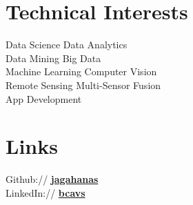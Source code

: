 \documentclass[letterpaper]{deedy-resume} %
\begin{document}
\begin{minipage}[t]{0.30\textwidth}
\sectionspace %



\section{Technical Interests}
Data Science \textbullet{} Data Analytics \\
Data Mining \textbullet{} Big Data \\
Machine Learning \textbullet{} Computer Vision \\
Remote Sensing \textbullet{} Multi-Sensor Fusion \\
App Development 

\sectionspace %


\section{Links} 

Github:// \href{https://github.com/jagahanas}{\bf jagahanas} \\
LinkedIn:// \href{https://www.linkedin.com/in/bcavs/}{\bf bcavs} \\

%
%

\sectionspace %


\end{minipage}
\end{document}
